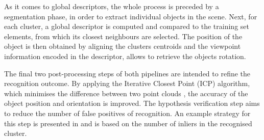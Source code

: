 As it comes to global descriptors, the whole process is preceded by a segmentation phase, in order to extract individual objects in the scene. Next, for each cluster, a global descriptor is computed and compared to the training set elements, from which its closest neighbours are selected. The position of the object is then obtained by aligning the clusters centroids and the viewpoint information encoded in the descriptor, allows to retrieve the objects rotation.

The final two post-processing steps of both pipelines are intended to refine the recognition outcome. By applying the Iterative Closest Point (ICP) algorithm, which minimises the difference between two point clouds \cite{icpwiki}, the accuracy of the object position and orientation is improved. The hypothesis verification step aims to reduce the number of false positives of recognition. An example strategy for this step is presented in \cite{hipoveri} and is based on the number of inliers in the recognised cluster. 